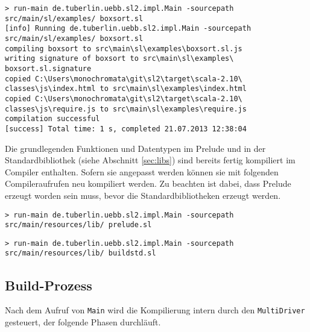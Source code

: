 \documentclass[runningheads]{llncs}
\begin{document}
\begin{verbatim}
> run-main de.tuberlin.uebb.sl2.impl.Main -sourcepath
src/main/sl/examples/ boxsort.sl
[info] Running de.tuberlin.uebb.sl2.impl.Main -sourcepath
src/main/sl/examples/ boxsort.sl
compiling boxsort to src\main\sl\examples\boxsort.sl.js
writing signature of boxsort to src\main\sl\examples\
boxsort.sl.signature
copied C:\Users\monochromata\git\sl2\target\scala-2.10\
classes\js\index.html to src\main\sl\examples\index.html
copied C:\Users\monochromata\git\sl2\target\scala-2.10\
classes\js\require.js to src\main\sl\examples\require.js
compilation successful
[success] Total time: 1 s, completed 21.07.2013 12:38:04
\end{verbatim}

Die grundlegenden Funktionen und Datentypen im Prelude und in der
Standardbibliothek (siehe Abschnitt \ref{sec:libs}) sind bereits
fertig kompiliert im Compiler enthalten. Sofern sie angepasst werden
können sie mit folgenden Compileraufrufen neu kompiliert werden. Zu
beachten ist dabei, dass Prelude erzeugt worden sein muss, bevor die
Standardbibliotheken erzeugt werden.

\begin{verbatim}
> run-main de.tuberlin.uebb.sl2.impl.Main -sourcepath
src/main/resources/lib/ prelude.sl
\end{verbatim}

\begin{verbatim}
> run-main de.tuberlin.uebb.sl2.impl.Main -sourcepath
src/main/resources/lib/ buildstd.sl
\end{verbatim}

\subsection{Build-Prozess}
\label{sec:compBuild}

Nach dem Aufruf von \texttt{Main} wird die Kompilierung intern durch
den \texttt{MultiDriver} gesteuert, der folgende Phasen durchläuft.
\end{document}
